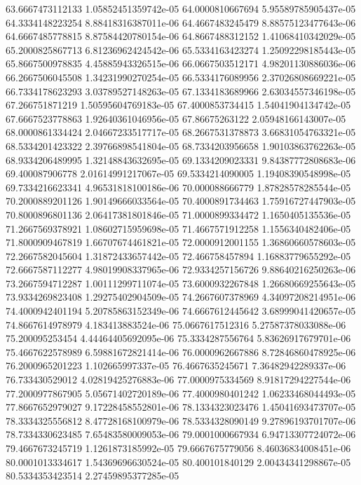 {63.6667473112133 1.05852451359742e-05
64.0000810667694 5.95589785905437e-05
64.3334148223254 8.88418316387011e-06
64.4667483245479 8.88575123477643e-06
64.6667485778815 8.87584420780154e-06
64.8667488312152 1.41068410342029e-05
65.2000825867713 6.81236962424542e-06
65.5334163423274 1.25092298185443e-05
65.8667500978835 4.45885943326515e-06
66.0667503512171 4.98201130886036e-06
66.2667506045508 1.34231990270254e-05
66.5334176089956 2.37026808669221e-05
66.7334178623293 3.03789527148263e-05
67.1334183689966 2.63034557346198e-05
67.266751871219 1.50595604769183e-05
67.4000853734415 1.54041904134742e-05
67.6667523778863 1.92640361046956e-05
67.86675263122 2.05948166143007e-05
68.0000861334424 2.04667233517717e-05
68.2667531378873 3.66831054763321e-05
68.5334201423322 2.39766898541804e-05
68.7334203956658 1.90103863762263e-05
68.9334206489995 1.32148843632695e-05
69.1334209023331 9.84387772808683e-06
69.400087906778 2.01614991217067e-05
69.5334214090005 1.19408390548998e-05
69.7334216623341 4.96531818100186e-06
70.000088666779 1.87828578285544e-05
70.2000889201126 1.90149666033564e-05
70.4000891734463 1.75916727447903e-05
70.8000896801136 2.06417381801846e-05
71.0000899334472 1.1650405135536e-05
71.2667569378921 1.08602715959698e-05
71.4667571912258 1.1556340482406e-05
71.8000909467819 1.66707674461821e-05
72.0000912001155 1.36860660578603e-05
72.2667582045604 1.31872433657442e-05
72.466758457894 1.16883779655292e-05
72.6667587112277 4.98019908337965e-06
72.9334257156726 9.88640216250263e-06
73.2667594712287 1.00111299711074e-05
73.6000932267848 1.26680669255643e-05
73.9334269823408 1.29275402904509e-05
74.2667607378969 4.34097208214951e-06
74.4000942401194 5.20785863152349e-06
74.6667612445642 3.68999041420657e-05
74.8667614978979 4.183413883524e-06
75.0667617512316 5.27587378033088e-06
75.200095253454 4.44464405692095e-06
75.3334287556764 5.83626917679701e-06
75.4667622578989 6.59881672821414e-06
76.0000962667886 8.72846860478925e-06
76.2000965201223 1.102665997337e-05
76.4667635245671 7.36482942289337e-06
76.733430529012 4.02819425276883e-06
77.0000975334569 8.91817294227544e-06
77.2000977867905 5.05671402720189e-06
77.4000980401242 1.06233468044493e-05
77.8667652979027 9.17228458552801e-06
78.1334323023476 1.45041693473707e-05
78.3334325556812 8.47728168100979e-06
78.5334328090149 9.27896193701707e-06
78.7334330623485 7.65483580009053e-06
79.0001000667934 6.94713307724072e-06
79.4667673245719 1.1261873185992e-05
79.6667675779056 8.46036834008451e-06
80.0001013334617 1.54369696630524e-05
80.400101840129 2.00434341298867e-05
80.5334353423514 2.27459895377285e-05
}

